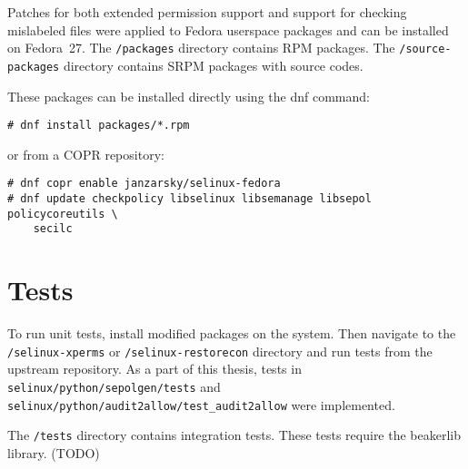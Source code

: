 Patches for both extended permission support and support for checking mislabeled
files were applied to Fedora userspace packages and can be installed on
Fedora~27. The \texttt{/packages} directory contains RPM packages. The
\texttt{/source-packages} directory contains SRPM packages with source codes.

These packages can be installed directly using the dnf command:
\begin{lstlisting}
# dnf install packages/*.rpm
\end{lstlisting}
or from a COPR repository:
\begin{lstlisting}
# dnf copr enable janzarsky/selinux-fedora
# dnf update checkpolicy libselinux libsemanage libsepol policycoreutils \
    secilc
\end{lstlisting}

\section{Tests}
To run unit tests, install modified packages on the system. Then navigate to the
\\ \texttt{/selinux-xperms} or \texttt{/selinux-restorecon} directory and run
tests from the upstream repository. As a part of this thesis, tests in
\texttt{selinux/python/sepolgen/tests} and \\
\texttt{selinux/python/audit2allow/test\_audit2allow} were implemented.

The \texttt{/tests} directory contains integration tests. These tests require
the beakerlib library. (TODO)


